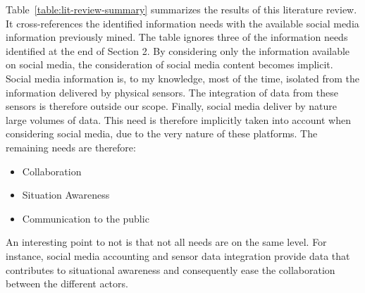 Table~\ref{table:lit-review-summary} summarizes the results of this literature review.
It cross-references the identified information needs with the available social media information previously mined.
The table ignores three of the information needs identified at the end of Section 2.
By considering only the information available on social media, the consideration of social media content becomes implicit.
Social media information is, to my knowledge, most of the time, isolated from the information delivered by physical sensors.
The integration of data from these sensors is therefore outside our scope.
Finally, social media deliver by nature large volumes of data.
This need is therefore implicitly taken into account when considering social media, due to the very nature of these platforms.
The remaining needs are therefore:

\begin{itemize}
    \item Collaboration
    \item Situation Awareness
    \item Communication to the public
\end{itemize}

An interesting point to not is that not all needs are on the same level.
For instance, social media accounting and sensor data integration provide data that contributes to situational awareness and consequently ease the collaboration between the different actors.

